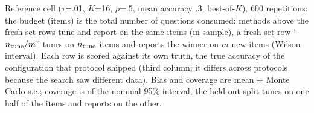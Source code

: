 Reference cell ($\tau$=.01, $K$=16, $\rho$=.5, mean accuracy .3, best-of-$K$), 600 repetitions; the budget (items) is the total number of questions consumed: methods above the fresh-set rows tune and report on the same items (in-sample), a fresh-set row ``$n_{\rm tune}/m$'' tunes on $n_{\rm tune}$ items and reports the winner on $m$ new items (Wilson interval). Each row is scored against its own truth, the true accuracy of the configuration that protocol shipped (third column; it differs across protocols because the search saw different data). Bias and coverage are mean $\pm$ Monte Carlo s.e.; coverage is of the nominal 95\% interval; the held-out split tunes on one half of the items and reports on the other.

